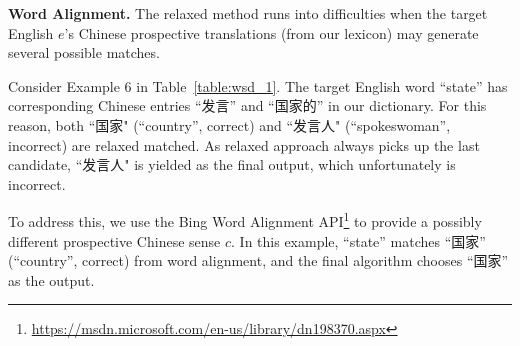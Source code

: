 \begin{CJK}{UTF8}{gbsn}



{\bf Word Alignment.}  The relaxed method runs into difficulties when
the target English $e$'s Chinese prospective translations (from our
lexicon) may generate several possible matches.  

Consider Example 6 in Table~\ref{table:wsd_1}.  The target English
word ``state'' has corresponding Chinese entries ``发言'' and ``国家的'' in our dictionary.
For this reason, both ``国家" (``country'', correct) and ``发言人" (``spokeswoman'', incorrect) are relaxed matched.  As relaxed approach always picks up the last candidate,  ``发言人" is yielded as the final output, which unfortunately is incorrect.

To address this, we use the Bing Word Alignment
API\footnote{\url{https://msdn.microsoft.com/en-us/library/dn198370.aspx}}
to provide a possibly different prospective Chinese sense $c$.  In
this example, ``state'' matches ``国家'' (``country'', correct) from
word alignment, and the final algorithm chooses ``国家'' as the
output.


\end{CJK}
